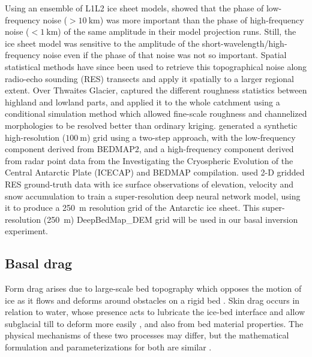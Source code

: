 Using an ensemble of L1L2 \citep{Hindmarshnumericalcomparisonapproximations2004,SchoofThinFilmFlowsWall2010} ice sheet models, \citet{SunDynamicresponseAntarctic2014} showed that the phase of low-frequency noise ($>\SI{10}{\kilo\metre}$) was more important than the phase of high-frequency noise ($<\SI{1}{\kilo\metre}$) of the same amplitude in their model projection runs.
Still, the ice sheet model was sensitive to the amplitude of the short-wavelength/high-frequency noise even if the phase of that noise was not so important.
Spatial statistical methods have since been used to retrieve this topographical noise along radio-echo sounding (\gls{RES}) transects and apply it spatially to a larger regional extent.
Over Thwaites Glacier, \citet{GoffConditionalsimulationThwaites2014} captured the different roughness statistics between highland and lowland parts, and applied it to the whole catchment using a conditional simulation method which allowed fine-scale roughness and channelized morphologies to be resolved better than ordinary kriging.
\citet{Grahamhighresolutionsyntheticbed2017} generated a synthetic high-resolution ($\SI{100}{\metre}$) grid using a two-step approach, with the low-frequency component derived from BEDMAP2, and a high-frequency component derived from radar point data from the Investigating the Cryospheric Evolution of the Central Antarctic Plate (ICECAP) and BEDMAP compilation.
\citet{LeongDeepBedMapsuperresolutiondeep2019} used 2-D gridded \gls{RES} ground-truth data with ice surface observations of elevation, velocity and snow accumulation to train a super-resolution deep neural network model, using it to produce a \SI{250}{\metre} resolution grid of the Antarctic ice sheet.
This super-resolution (\SI{250}{\metre}) DeepBedMap\_DEM grid \citep[version 1.1,][]{LeongDeepBedMap2020} will be used in our basal inversion experiment.



\subsection{Basal drag}


Form drag arises due to large-scale bed topography which opposes the motion of ice as it flows and deforms around obstacles on a rigid bed \citep[][]{WeertmanSlidingGlaciers1957,SchoofBasalperturbationsice2002}.
Skin drag occurs in relation to water, whose presence acts to lubricate the ice-bed interface and allow subglacial till to deform more easily \citep{IversonExperimentsdynamicssedimentary2015}, and also from bed material properties.
The physical mechanisms of these two processes may differ, but the mathematical formulation and parameterizations for both are similar \citep{Minchewuniversalglacierslip2020}.

